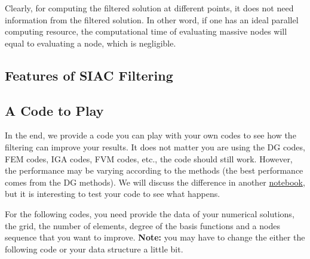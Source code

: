 \documentclass[11pt]{article}
\begin{document}
Clearly, for computing the filtered solution at different points, it
does not need information from the filtered solution. In other word, if
one has an ideal parallel computing resource, the computational time of
evaluating massive nodes will equal to evaluating a node, which is
negligible.

    \subsection{Features of SIAC
Filtering}\label{features-of-siac-filtering}

    \subsection{A Code to Play}\label{a-code-to-play}

In the end, we provide a code you can play with your own codes to see
how the filtering can improve your results. It does not matter you are
using the DG codes, FEM codes, IGA codes, FVM codes, etc., the code
should still work. However, the performance may be varying according to
the methods (the best performance comes from the DG methods). We will
discuss the difference in another \href{}{notebook}, but it is
interesting to test your code to see what happens.

For the following codes, you need provide the data of your numerical
solutions, the grid, the number of elements, degree of the basis
functions and a nodes sequence that you want to improve. \textbf{Note:}
you may have to change the either the following code or your data
structure a little bit.
\end{document}
